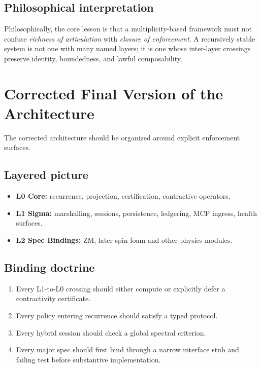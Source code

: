 \documentclass[11pt]{article}
\begin{document}
\subsection{Philosophical interpretation}

Philosophically, the core lesson is that a multiplicity-based framework must not confuse \emph{richness of articulation} with \emph{closure of enforcement}. A recursively stable system is not one with many named layers; it is one whose inter-layer crossings preserve identity, boundedness, and lawful composability.

\section{Corrected Final Version of the Architecture}

The corrected architecture should be organized around explicit enforcement surfaces.

\subsection{Layered picture}

\begin{itemize}
\item \textbf{L0 Core:} recurrence, projection, certification, contractive operators.
\item \textbf{L1 Sigma:} marshalling, sessions, persistence, ledgering, MCP ingress, health surfaces.
\item \textbf{L2 Spec Bindings:} ZM, later spin foam and other physics modules.
\end{itemize}

\subsection{Binding doctrine}

\begin{enumerate}[label=\arabic*.]
\item Every L1-to-L0 crossing should either compute or explicitly defer a contractivity certificate.
\item Every policy entering recurrence should satisfy a typed protocol.
\item Every hybrid session should check a global spectral criterion.
\item Every major spec should first bind through a narrow interface stub and failing test before substantive implementation.
\end{enumerate}
\end{document}
